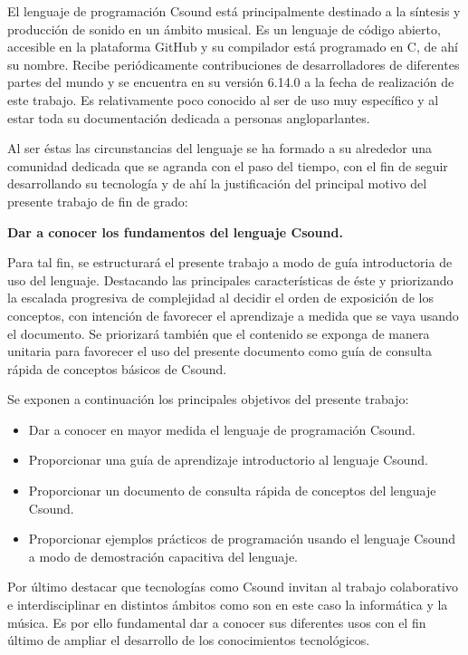 

El lenguaje de programaci\'on Csound est\'a principalmente destinado a la s\'intesis y producci\'on de sonido en un \'ambito musical.
Es un lenguaje de c\'odigo abierto, accesible en la plataforma GitHub y su compilador está programado en C, de ahí su nombre.
Recibe peri\'odicamente contribuciones de desarrolladores de diferentes partes del mundo y se encuentra en su versi\'on 6.14.0 a la fecha de realizaci\'on de este trabajo.
Es relativamente poco conocido al ser de uso muy específico y al estar toda su documentación dedicada a personas angloparlantes.

Al ser \'estas las circunstancias del lenguaje se ha formado a su alrededor una comunidad dedicada que se agranda con el paso del tiempo, con el fin de seguir desarrollando su tecnología y 
de ahí la justificación del principal motivo del presente trabajo de fin de grado: \bigskip

\begin{center}
\textbf{Dar a conocer los fundamentos del lenguaje Csound.}\bigskip
\end{center}

Para tal fin, se estructurará el presente trabajo a modo de guía introductoria de uso del lenguaje. Destacando las principales características de éste y priorizando la escalada progresiva de 
complejidad al decidir el orden de exposición de los conceptos, con intención de favorecer el aprendizaje a medida que se vaya usando el documento. Se priorizará también que el contenido se exponga de manera unitaria 
para favorecer el uso del presente documento como guía de consulta rápida de conceptos básicos de Csound.\bigskip

Se exponen a continuación los principales objetivos del presente trabajo: 
\begin{itemize}
\item Dar a conocer en mayor medida el lenguaje de programación Csound.
\item Proporcionar una guía de aprendizaje introductorio al lenguaje Csound.
\item Proporcionar un documento de consulta rápida de conceptos del lenguaje Csound.
\item Proporcionar ejemplos prácticos de programación usando el lenguaje Csound a modo de demostración capacitiva del lenguaje.
\end{itemize}

Por último destacar que tecnologías como Csound invitan al trabajo colaborativo e interdisciplinar en distintos ámbitos como son en este caso la informática y la música. Es por ello fundamental dar a conocer sus diferentes usos con el fin último de ampliar 
el desarrollo de los conocimientos tecnológicos.


